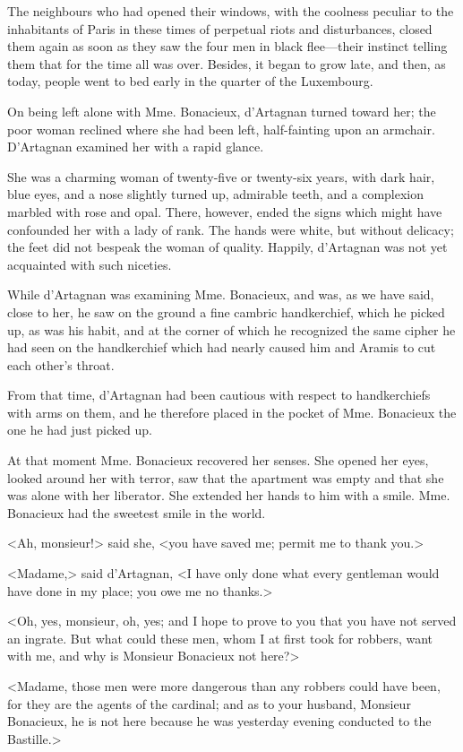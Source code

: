 The neighbours who had opened their windows, with the coolness peculiar to the inhabitants of Paris in these times of perpetual riots and disturbances, closed them again as soon as they saw the four men in black flee---their instinct telling them that for the time all was over. Besides, it began to grow late, and then, as today, people went to bed early in the quarter of the Luxembourg. 

On being left alone with Mme. Bonacieux, d'Artagnan turned toward her; the poor woman reclined where she had been left, half-fainting upon an armchair. D'Artagnan examined her with a rapid glance. 

She was a charming woman of twenty-five or twenty-six years, with dark hair, blue eyes, and a nose slightly turned up, admirable teeth, and a complexion marbled with rose and opal. There, however, ended the signs which might have confounded her with a lady of rank. The hands were white, but without delicacy; the feet did not bespeak the woman of quality. Happily, d'Artagnan was not yet acquainted with such niceties. 

While d'Artagnan was examining Mme. Bonacieux, and was, as we have said, close to her, he saw on the ground a fine cambric handkerchief, which he picked up, as was his habit, and at the corner of which he recognized the same cipher he had seen on the handkerchief which had nearly caused him and Aramis to cut each other's throat. 

From that time, d'Artagnan had been cautious with respect to handkerchiefs with arms on them, and he therefore placed in the pocket of Mme. Bonacieux the one he had just picked up. 

At that moment Mme. Bonacieux recovered her senses. She opened her eyes, looked around her with terror, saw that the apartment was empty and that she was alone with her liberator. She extended her hands to him with a smile. Mme. Bonacieux had the sweetest smile in the world. 

<Ah, monsieur!> said she, <you have saved me; permit me to thank you.> 

<Madame,> said d'Artagnan, <I have only done what every gentleman would have done in my place; you owe me no thanks.> 

<Oh, yes, monsieur, oh, yes; and I hope to prove to you that you have not served an ingrate. But what could these men, whom I at first took for robbers, want with me, and why is Monsieur Bonacieux not here?> 

<Madame, those men were more dangerous than any robbers could have been, for they are the agents of the cardinal; and as to your husband, Monsieur Bonacieux, he is not here because he was yesterday evening conducted to the Bastille.> 

